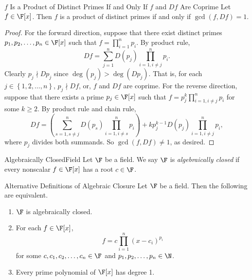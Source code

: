 \documentclass[linearalgebra]{subfiles}
\begin{document}
    \clearpage
    \begin{prop}{$f$ Is a Product of Distinct Primes If and Only If $f$ and $Df$ Are Coprime}
        Let $f\in \F[x]$. Then $f$ is a product of distinct primes if and only if $\gcd(f, Df) = 1$.
    \end{prop}

    \begin{proof}
        For the forward direction, suppose that there exist distinct primes $p_1, p_2, \ldots, p_n\in \F[x]$ such that $f = \prod^{n}_{i=1} p_i$. By product rule,
        \begin{equation*}
            Df = \sum^{n}_{j=1} D(p_j) \prod^{n}_{i=1, i\neq j} p_i. 
        \end{equation*}
        Clearly $p_j\nmid Dp_j$ since $\deg(p_j) > \deg(Dp_j)$. That is, for each $j\in \left\lbrace 1, 2, \ldots, n \right\rbrace$, $p_j\nmid Df$, or, $f$ and $Df$ are coprime. For the reverse direction, suppose that there exists a prime $p_j\in \F[x]$ such that $f = p_j^k \prod^{n}_{i=1, i\neq j} p_i$ for some $k\geq 2$. By product rule and chain rule,
        \begin{equation*}
            Df = \left( \sum^{n}_{s=1, s\neq j} D(p_s) \prod^{n}_{i=1, i\neq s} p_i  \right) + kp_j^{k-1} D(p_j) \prod^{n}_{i=1, i\neq j} p_i, 
        \end{equation*}
        where $p_j$ divides both summands. So $\gcd(f, Df)\neq 1$, as desired.
    \end{proof}

    \begin{definition}{Algebraically Closed}{Field}
        Let $\F$ be a field. We say $\F$ is \emph{algebraically closed} if every nonscalar $f\in \F[x]$ has a root $c\in \F$.
    \end{definition}

    \begin{prop}{Alternative Definitions of Algebraic Closure}
        Let $\F$ be a field. Then the following are equivalent.
        \begin{enumerate}
            \item $\F$ is algebraically closed.
            \item For each $f\in \F[x]$, 
                \begin{equation*}
                    f = c\prod^{n}_{i=1} \left( x-c_i \right) ^{p_i}
                \end{equation*}
                for some $c, c_1, c_2, \ldots, c_n\in \F$ and $p_1, p_2, \ldots, p_n\in \N$.
            \item Every prime polynomial of $\F[x]$ has degree 1.
        \end{enumerate}
    \end{prop}
\end{document}
